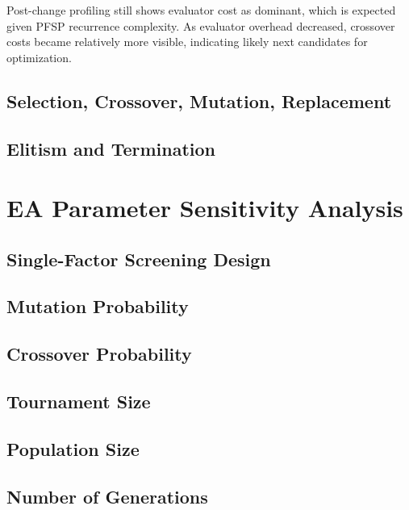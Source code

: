 \documentclass[12pt,a4paper]{report}
\begin{document}
Post-change profiling still shows evaluator cost as dominant, which is expected given PFSP recurrence complexity.
As evaluator overhead decreased, crossover costs became relatively more visible, indicating likely next candidates
for optimization.

\section{Selection, Crossover, Mutation, Replacement}

\section{Elitism and Termination}

\chapter{EA Parameter Sensitivity Analysis}
\section{Single-Factor Screening Design}

\section{Mutation Probability}

\section{Crossover Probability}

\section{Tournament Size}

\section{Population Size}

\section{Number of Generations}
\end{document}
